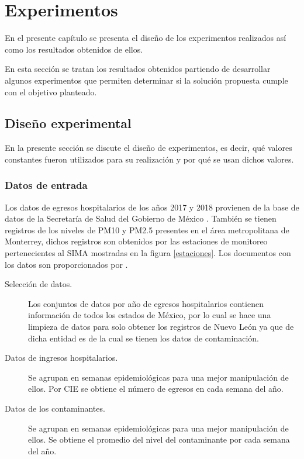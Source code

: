 \chapter{Experimentos}

En el presente capítulo se presenta el diseño de los experimentos realizados así como los resultados obtenidos de ellos.

En esta sección se tratan los resultados obtenidos partiendo de desarrollar algunos experimentos que permiten determinar si la solución propuesta cumple con el objetivo planteado.

\section{Diseño experimental}
En la presente sección se discute el diseño de experimentos, es decir, qué valores constantes fueron utilizados para su realización y por qué se usan dichos valores.

\subsection{Datos de entrada}
Los datos de egresos hospitalarios de los años 2017 y 2018 provienen de la base de datos de la Secretaría de Salud del Gobierno de México \cite{f1}. También se tienen registros de los niveles de PM10 y PM2.5 presentes en el área metropolitana de Monterrey, dichos registros son obtenidos por las estaciones de monitoreo pertenecientes al SIMA \cite{f2} mostradas en la figura \ref{estaciones}. Los documentos con los datos son proporcionados por \citet{f3}.

\begin{description}
\item [Selección de datos.] {Los conjuntos de datos por año de egresos hospitalarios contienen información de todos los estados de México, por lo cual se hace una limpieza de datos para solo obtener los registros de Nuevo León ya que de dicha entidad es de la cual se tienen los datos de contaminación.}
\item [Datos de ingresos hospitalarios.] {Se agrupan en semanas epidemiológicas para una mejor manipulación de ellos. Por CIE se obtiene el número de egresos en cada semana del año.}
\item [Datos de los contaminantes.] {Se agrupan en semanas epidemiológicas para una mejor manipulación de ellos. Se obtiene el promedio del nivel del contaminante por cada semana del año.}
\end{description}

